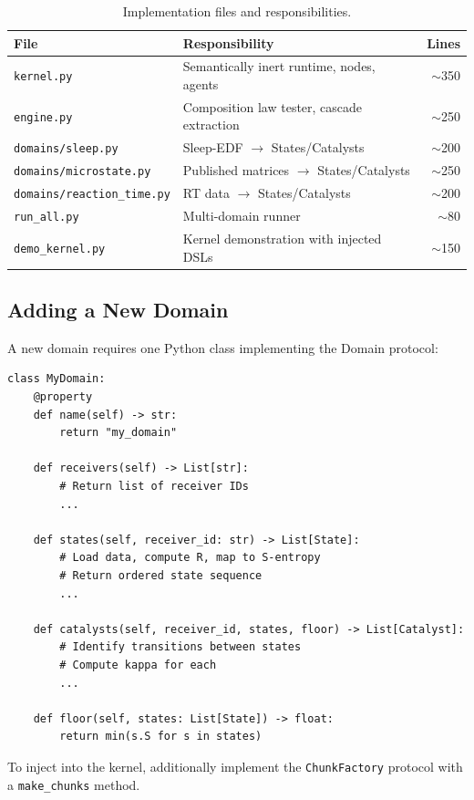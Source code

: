 \documentclass[11pt,a4paper]{article}
\theoremstyle{definition}
\theoremstyle{remark}
\begin{document}
\begin{table}[H]
\centering
\caption{Implementation files and responsibilities.}
\begin{tabular}{@{}llr@{}}
\toprule
File & Responsibility & Lines \\
\midrule
\texttt{kernel.py} & Semantically inert runtime, nodes, agents & $\sim$350 \\
\texttt{engine.py} & Composition law tester, cascade extraction & $\sim$250 \\
\texttt{domains/sleep.py} & Sleep-EDF $\to$ States/Catalysts & $\sim$200 \\
\texttt{domains/microstate.py} & Published matrices $\to$ States/Catalysts & $\sim$250 \\
\texttt{domains/reaction\_time.py} & RT data $\to$ States/Catalysts & $\sim$200 \\
\texttt{run\_all.py} & Multi-domain runner & $\sim$80 \\
\texttt{demo\_kernel.py} & Kernel demonstration with injected DSLs & $\sim$150 \\
\bottomrule
\end{tabular}
\end{table}

\subsection{Adding a New Domain}

A new domain requires one Python class implementing the Domain protocol:

\begin{lstlisting}[style=python]
class MyDomain:
    @property
    def name(self) -> str:
        return "my_domain"
    
    def receivers(self) -> List[str]:
        # Return list of receiver IDs
        ...
    
    def states(self, receiver_id: str) -> List[State]:
        # Load data, compute R, map to S-entropy
        # Return ordered state sequence
        ...
    
    def catalysts(self, receiver_id, states, floor) -> List[Catalyst]:
        # Identify transitions between states
        # Compute kappa for each
        ...
    
    def floor(self, states: List[State]) -> float:
        return min(s.S for s in states)
\end{lstlisting}

To inject into the kernel, additionally implement the \texttt{ChunkFactory} protocol with a \texttt{make\_chunks} method.
\end{document}
